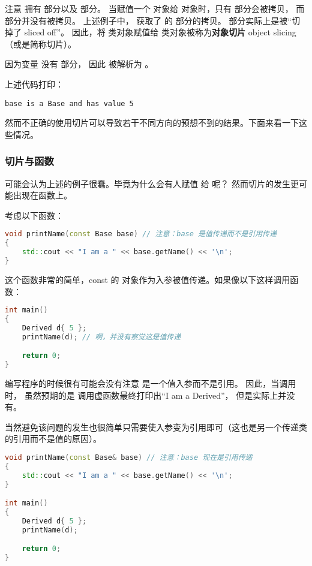 \documentclass[../../LearnCpp.tex]{subfiles}
\begin{document}
注意  拥有  部分以及  部分。
当赋值一个  对象给  对象时，只有  部分会被拷贝，
而  部分并没有被拷贝。
上述例子中， 获取了  的  部分的拷贝。
 部分实际上是被“切掉了 sliced off”。
因此，将  类对象赋值给  类对象被称为\textbf{对象切片} object slicing（或是简称切片）。

因为变量  没有  部分，
因此  被解析为 。

上述代码打印：

\begin{lstlisting}
base is a Base and has value 5
\end{lstlisting}

然而不正确的使用切片可以导致若干不同方向的预想不到的结果。下面来看一下这些情况。

\subsubsection*{切片与函数}

可能会认为上述的例子很蠢。毕竟为什么会有人赋值  给  呢？
然而切片的发生更可能出现在函数上。

考虑以下函数：

\begin{lstlisting}[language=C++]
void printName(const Base base) // 注意：base 是值传递而不是引用传递
{
    std::cout << "I am a " << base.getName() << '\n';
}
\end{lstlisting}

这个函数非常的简单，const 的  对象作为入参被值传递。如果像以下这样调用函数：

\begin{lstlisting}[language=C++]
int main()
{
    Derived d{ 5 };
    printName(d); // 啊，并没有察觉这是值传递

    return 0;
}
\end{lstlisting}

编写程序的时候很有可能会没有注意  是一个值入参而不是引用。
因此，当调用  时，
虽然预期的是  调用虚函数最终打印出“I am a Derived”，
但是实际上并没有。

当然避免该问题的发生也很简单只需要使入参变为引用即可（这也是另一个传递类的引用而不是值的原因）。

\begin{lstlisting}[language=C++]
void printName(const Base& base) // 注意：base 现在是引用传递
{
    std::cout << "I am a " << base.getName() << '\n';
}

int main()
{
    Derived d{ 5 };
    printName(d);

    return 0;
}
\end{lstlisting}
\end{document}
